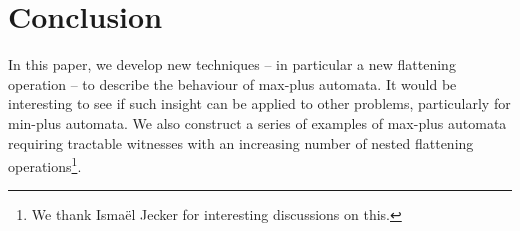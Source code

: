 \documentclass{lmcs}
\theoremstyle{remark}
\theoremstyle{remark}
\begin{document}
\section{Conclusion}
In this paper, we develop new techniques -- in particular a new flattening operation -- to describe the behaviour of max-plus automata. It would be interesting to see if such insight can be applied to other problems, particularly for min-plus automata. We also construct a series of examples of max-plus automata requiring tractable witnesses with an increasing number of nested flattening operations\footnote{We thank Isma\"el Jecker for interesting discussions on this.}.



\end{document}
